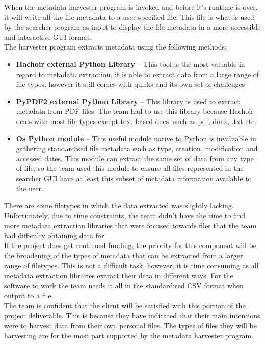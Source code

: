 \documentclass[11pt]{article}
\begin{document}
\begin{adjustwidth}{1cm}{}
When the metadata harvester program is invoked and before it’s runtime is over, it will write all the file metadata to a user-specified file. This file is what is used by the searcher program as input to display the file metadata in a more accessible and interactive GUI format. \\

The harvester program extracts metadata using the following methods:

\begin{itemize}
\item \textbf{Hachoir external Python Library} – This tool is the most valuable in regard to metadata extraction, it is able to extract data from a large range of file types, however it still comes with quirks and its own set of challenges
\item \textbf{PyPDF2 external Python Library} – This library is used to extract metadata from PDF files. The team had to use this library because Hachoir deals with most file types except text-based ones, such as pdf, docx, .txt etc. 
\item \textbf{Os Python module} – This useful module native to Python is invaluable in gathering standardised file metadata such as type, creation, modification and accessed dates. This module can extract the same set of data from any type of file, so the team used this module to ensure all files represented in the searcher GUI have at least this subset of metadata information available to the user.

\end{itemize}
	
There are some filetypes in which the data extracted was slightly lacking. Unfortunately, due to time constraints, the team didn't have the time to find more metadata extraction libraries that were focused towards files that the team had difficulty obtaining data for. \\

If the project does get continued funding, the priority for this component will be the broadening of the types of metadata that can be extracted from a larger range of filetypes. This is not a difficult task, however, it is time consuming as all metadata extraction libraries extract their data in different ways. For the software to work the team needs it all in the standardised CSV format when output to a file. \\

The team is confident that the client will be satisfied with this portion of the project deliverable. This is because they have indicated that their main intentions were to harvest data from their own personal files. The types of  files they will be harvesting are for the most part supported by the metadata harvester program. \\


\end{adjustwidth}
\end{document}
